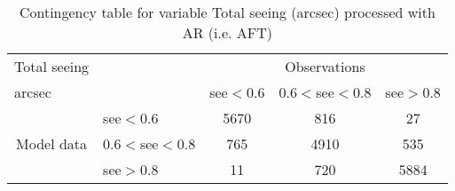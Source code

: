 
\begin{table}[]
\begin{center}
\begin{tabular}{llccc}
\hline
{Total seeing}                                       &                                                    & \multicolumn{3}{c}{Observations}                 \\
{arcsec}                                       &                             & see$<0.6$   & $0.6<$see$<0.8$ & see$>0.8$ \\
\hline
\multicolumn{1}{c}{\multirow{3}{*}{Model data}}  & see$<0.6$          & 5670                & 816                       & 27              \\
                                                 & $0.6<$see$<0.8$ & 765                & 4910                       & 535              \\
                                                 & see$>0.8$          & 11                & 720                       & 5884              \\
\hline
\end{tabular}
\end{center}
\caption{Contingency table for variable Total seeing (arcsec) processed with AR (i.e. AFT)}
\label{tab:contingency}
\end{table}
